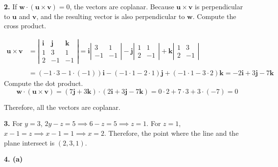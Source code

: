 \documentclass{article}
\begin{document}
\vspace{1em}

\textbf{2.} If $\mathbf{w}\cdot(\mathbf{u}\times\mathbf{v})=0$, the vectors are coplanar. Because $\mathbf{u}\times\mathbf{v}$ is perpendicular to $\mathbf u$ and $\mathbf v$, and the resulting vector is also perpendicular to $\mathbf w$. Compute the cross product.

\begin{align*}\mathbf{u}\times\mathbf{v}&=\left|\begin{array}{ccc}
\mathbf{i}&\mathbf{j}&\mathbf{k}\\
1&3&1\\
2&-1&-1
\end{array}\right|=\mathbf{i}\left|\begin{array}{cc}
3&1\\-1&-1
\end{array}\right|-\mathbf{j}\left|\begin{array}{cc}
1&1\\2&-1
\end{array}\right|+\mathbf{k}\left|\begin{array}{cc}
1&3\\2&-1
\end{array}\right|\\\\&=(-1\cdot3-1\cdot(-1))\mathbf{i}-(-1\cdot1-2\cdot1)\mathbf{j}+(-1\cdot1-3\cdot2)\mathbf{k}=-2\mathbf i+3\mathbf j-7\mathbf k\end{align*}
Compute the dot product.
\[\mathbf w\cdot(\mathbf u\times\mathbf v)=(7\mathbf j+3\mathbf k)\cdot(2\mathbf i+3\mathbf j-7\mathbf k)=0\cdot2+7\cdot3+3\cdot(-7)=0\]

Therefore, all the vectors are coplanar.

\vspace{1em}

\textbf{3.} For $y=3$, $2y-z=5\implies6-z=5\implies z=1$. For $z=1$, $x-1=z\implies x-1=1\implies x=2$. Therefore, the point where the line and the plane intersect is $\boxed{(2,3,1)}$.

\vspace{1em}

\textbf{4. (a)}
\begin{center}
\end{center}
\end{document}
